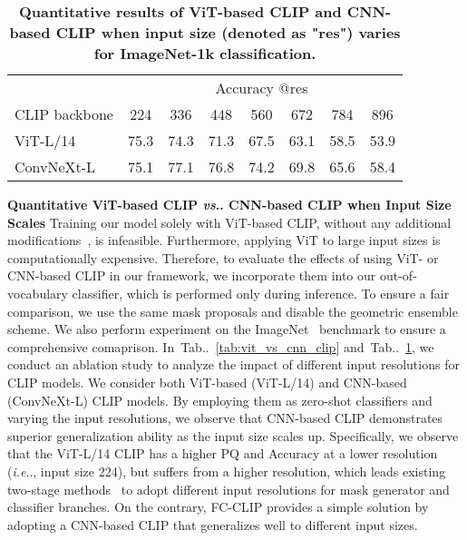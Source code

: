 \documentclass{article}
\makeatletter
\DeclareRobustCommand\onedot{\futurelet\@let@token\@onedot}
\def\@onedot{\ifx\@let@token.\else.\null\fi\xspace}
\def\ie{\emph{i.e}\onedot}
\def\vs{\emph{vs}\onedot}
\newcommand{\tabref}[1]{Tab\onedot~\ref{#1}}
\newcommand{\modelname}{FC-CLIP\xspace}
\newcommand{\tablestyle}[2]{\setlength{\tabcolsep}{#1}\renewcommand{\arraystretch}{#2}\centering\footnotesize}
\makeatother
\begin{document}
\begin{table}[!t]
\tablestyle{2pt}{1.3}
\caption{
\textbf{Quantitative results of ViT-based CLIP and CNN-based CLIP when input size (denoted as "res") varies for ImageNet-1k classification.}
}
\label{tab:vit_vs_cnn_clip_in1k}
\begin{tabular}{l|ccccccc}
                              & \multicolumn{7}{c}{Accuracy @res}                     \\
   CLIP backbone                    & 224            & 336            & 448   & 560 &  672      & 784            & 896    \\
   \shline
   ViT-L/14 & 75.3 & 74.3 & 71.3  & 67.5 & 63.1 & 58.5 & 53.9 \\
   ConvNeXt-L  & 75.1 & 77.1 & 76.8 & 74.2 & 69.8 & 65.6 & 58.4
\end{tabular}
\end{table}

\noindent \textbf{Quantitative ViT-based CLIP \vs CNN-based CLIP when Input Size Scales}\quad
Training our model solely with ViT-based CLIP, without any additional modifications~\cite{zhou2022extract,chen2023vision,xu2023side,cho2023cat}, is infeasible. Furthermore, applying ViT to large input sizes is computationally expensive.
Therefore, to evaluate the effects of using ViT- or CNN-based CLIP in our framework, we incorporate them into our out-of-vocabulary classifier, which is performed only during inference.
To ensure a fair comparison, we use the same mask proposals and disable the geometric ensemble scheme. We also perform experiment on the ImageNet~\cite{russakovsky2015imagenet} benchmark to ensure a comprehensive comaprison.
In~\tabref{tab:vit_vs_cnn_clip} and~\tabref{tab:vit_vs_cnn_clip_in1k}, we conduct an ablation study to analyze the impact of different input resolutions for CLIP models.
We consider both ViT-based (ViT-L/14) and CNN-based (ConvNeXt-L) CLIP models.
By employing them as zero-shot classifiers and varying the input resolutions, we observe that CNN-based CLIP demonstrates superior generalization ability as the input size scales up.
Specifically, we observe that the ViT-L/14 CLIP has a higher PQ and Accuracy at a lower resolution (\ie, input size 224), but suffers from a higher resolution, which leads existing two-stage methods~\cite{xu2021simple,liang2022open,ding2022open,xu2023side,xu2023open} to adopt different input resolutions for mask generator and classifier branches.
On the contrary, \modelname provides a simple solution by adopting a CNN-based CLIP that generalizes well to different input sizes.
\end{document}
